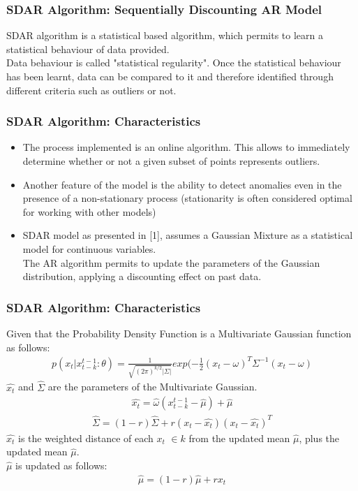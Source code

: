 \documentclass[aspectratio=1610]{beamer}
\begin{document}
\begin{frame}
\frametitle{SDAR Algorithm: Sequentially Discounting AR Model}
SDAR algorithm is a statistical based algorithm, which permits to learn a statistical behaviour of data provided. \\
Data behaviour is called "statistical regularity". Once the statistical behaviour has been learnt, data can be compared to it and therefore identified through different criteria such as outliers or not.
\end{frame}
\begin{frame}
\frametitle{SDAR Algorithm: Characteristics}
\begin{itemize}
\item The process implemented is an online algorithm. This allows to immediately determine whether or not a given subset of points represents outliers.\\
\item Another feature of the model is the ability to detect anomalies even in the presence of a non-stationary process (stationarity is often considered optimal for working with other models)\\
\item SDAR model as presented in [1], assumes a Gaussian Mixture as a statistical model for continuous variables.\\
The AR algorithm permits to update the parameters of the Gaussian distribution, applying a discounting effect on past data.
\end{itemize}
\end{frame}
\begin{frame}
	\frametitle{SDAR Algorithm: Characteristics}
Given that the Probability Density Function is a Multivariate Gaussian function as follows:
\begin{eqnarray}
p(x_t|x^{t-1}_{t-k}:\theta)=\frac{1}{\sqrt{(2\pi)^{k/2}|\Sigma|}}exp(-\frac{1}{2}(x_{t}-\omega)^T\Sigma^{-1}(x_{t}-\omega)
\end{eqnarray}
$\hat{x_t}$ and $\hat{\Sigma}$ are the parameters of the Multivariate Gaussian.
\begin{eqnarray}
\hat{x_t}=\hat{\omega}(x^{t-1}_{t-k}-\hat{\mu})+\hat{\mu}
\end{eqnarray}
\begin{eqnarray}
\hat{\Sigma}=(1-r)\hat{\Sigma}+r(x_t-\hat{x_t})(x_t-\hat{x_t})^T
\end{eqnarray}
$\hat{x_t}$ is the weighted distance of each $x_t$ $\in{k}$ from the updated mean $\hat{\mu}$, plus the updated mean $\hat{\mu}$.
\\$\hat{\mu}$ is updated as follows:
\begin{eqnarray}
\hat{\mu}=(1-r)\hat{\mu}+rx_t
\end{eqnarray}
\end{frame}
\end{document}

